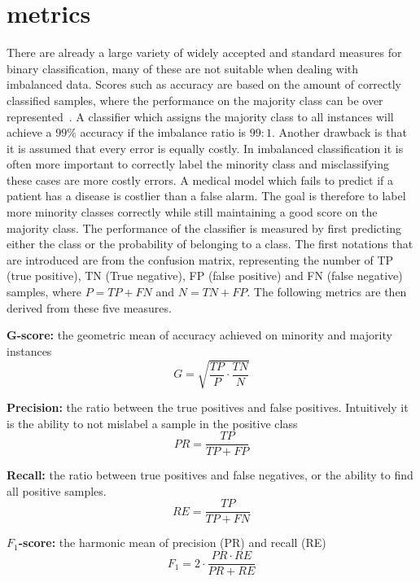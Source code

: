 \section{metrics}
There are already a large variety of widely accepted and standard measures for binary classification, many of these are not suitable when dealing with imbalanced data. Scores such as accuracy are based on the amount of correctly classified samples, where the performance on the majority class can be over represented~\cite{Fernandez2018LearningSets}. A classifier which assigns the majority class to all instances will achieve a $99\%$ accuracy if the imbalance ratio is $99:1$. Another drawback is that it is assumed that every error is equally costly. In imbalanced classification it is often more important to correctly label the minority class and misclassifying these cases are more costly errors. A medical model which fails to predict if a patient has a disease is costlier than a false alarm. The goal is therefore to label more minority classes correctly while still maintaining a good score on the majority class. The performance of the classifier is measured by first predicting either the class or the probability of belonging to a class. The first notations that are introduced are from the confusion matrix, representing the number of TP (true positive), TN (True negative), FP (false positive) and FN (false negative) samples, where $P = TP + FN$ and $N = TN + FP$. The following metrics are then derived from these five measures.

\textbf{G-score:} the geometric mean of accuracy achieved on minority and majority instances
\begin{equation}
    G = \sqrt{\frac{TP}{P} \cdot \frac{TN}{N}}
\end{equation}

\textbf{Precision:} the ratio between the true positives and false positives. Intuitively it is the ability to not mislabel a sample in the positive class
\begin{equation}
    PR = \frac{TP}{TP + FP}
\end{equation}

\textbf{Recall:} the ratio between true positives and false negatives, or the ability to find all positive samples.
\begin{equation}
    RE = \frac{TP}{TP + FN}
\end{equation}

\textbf{$F_1$-score:} the harmonic mean of precision (PR) and recall (RE)
\begin{equation}
    F_1 = 2 \cdot \frac{PR \cdot RE}{PR + RE}
\end{equation}

